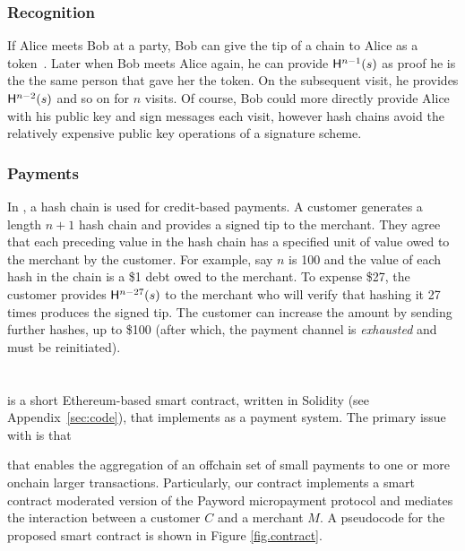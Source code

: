 \subsubsection{Recognition}

 If Alice meets Bob at a party, Bob can give the tip of a chain to Alice as a token~\cite{ABC+98}. Later when Bob meets Alice again, he can provide $\mathsf{H}^{n-1}(s)$ as proof he is the the same person that gave her the token. On the subsequent visit, he provides $\mathsf{H}^{n-2}(s)$ and so on for $n$ visits. Of course, Bob could more directly provide Alice with his public key and sign messages each visit, however hash chains avoid the relatively expensive public key operations of a signature scheme. 

\subsubsection{Payments}

In \pw, a hash chain is used for credit-based payments. A customer generates a length $n+1$ hash chain and provides a signed tip to the merchant. They agree that each preceding value in the hash chain has a specified unit of value owed to the merchant by the customer. For example, say $n$ is 100 and the value of each hash in the chain is a \$1 debt owed to the merchant. To expense \$27, the customer provides $\mathsf{H}^{n-27}(s)$ to the merchant who will verify that hashing it 27 times produces the signed tip. The customer can increase the amount by sending further hashes, up to \$100 (after which, the payment channel is \textit{exhausted} and must be reinitiated).


\section{\ew}

\ew is a short Ethereum-based smart contract, written in Solidity (see Appendix~\ref{sec:code}), that implements \pw as a payment system. The primary issue with \pw is that 

 that enables the aggregation of an offchain set of small payments to one or more onchain larger transactions. Particularly, our contract implements a smart contract moderated version of the Payword micropayment protocol and mediates the interaction between a customer $C$ and a merchant $M$. A pseudocode for the proposed smart contract is shown in Figure \ref{fig.contract}. 

